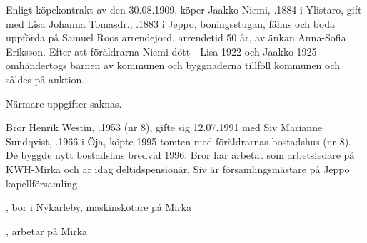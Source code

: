 %
Enligt köpekontrakt av den 30.08.1909, köper Jaakko Niemi, .1884 i Ylistaro, gift med Lisa Johanna Tomasdr., .1883 i Jeppo, boningsstugan, fähus och boda uppförda på Samuel Roos arrendejord, arrendetid 50 år, av änkan Anna-Sofia Eriksson. Efter att föräldrarna Niemi dött - Lisa 1922 och Jaakko 1925 - omhändertogs barnen av kommunen och byggnaderna tillföll kommunen och såldes på auktion.
\begin{jhchildren}
  \item {}
  \item {}
  \item {}
  \item {}
  \item {}
\end{jhchildren}


%
Närmare uppgifter saknas.\jhvspace{}



%



%
Bror Henrik Westin, .1953 (nr 8), gifte sig 12.07.1991 med Siv Marianne Sundqvist, .1966 i Öja, köpte 1995 tomten med föräldrarnas bostadshus (nr 8). De byggde nytt bostadshus bredvid 1996. Bror har arbetat som arbetsledare på KWH-Mirka och är idag deltidspensionär. Siv är församlingsmästare på Jeppo kapellförsamling.
\begin{jhchildren}
  \item {}, bor i Nykarleby, maskinskötare på Mirka
  \item {}, arbetar på Mirka
\end{jhchildren}



